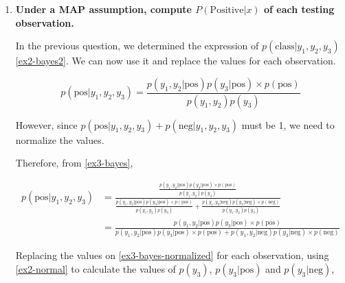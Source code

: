 \documentclass[12pt]{article}
\begin{document}
\begin{enumerate}[leftmargin=\labelsep,resume]
    \item \textbf{Under a MAP assumption, compute $P(\text{Positive} | x)$ of each testing observation.}

          In the previous question, we determined the expression of $p(\text{class} | y_1,y_2,y_3)$ \eqref{ex2-bayes2}.
          We can now use it and replace the values for each observation.

          \begin{equation}\label{ex3-bayes}
              p(\text{pos}| y_1, y_2, y_3) = \frac{p(y_1, y_2 | \text{pos}) p(y_3 | \text{pos}) \times p(\text{pos})}{p(y_1, y_2)p(y_3)}
          \end{equation}

          However, since $p(\text{pos}|y_1,y_2,y_3) + p(\text{neg}|y_1,y_2,y_3)$ must be 1, we need to normalize the values.

          Therefore, from \eqref{ex3-bayes},

          \begin{equation}\label{ex3-bayes-normalized}
              \begin{aligned}
                  p(\text{pos}| y_1, y_2, y_3) & = \frac{
                      \frac{p(y_1, y_2 | \text{pos}) p(y_3 | \text{pos}) \times p(\text{pos})}{p(y_1, y_2)p(y_3)}
                  }{
                      \frac{p(y_1, y_2 | \text{pos}) p(y_3 | \text{pos}) \times p(\text{pos})}{p(y_1, y_2)p(y_3)} +
                      \frac{p(y_1, y_2 | \text{neg}) p(y_3 | \text{neg}) \times p(\text{neg})}{p(y_1, y_2)p(y_3)}
                  }                                       \\
                                               & = \frac{
                      p(y_1, y_2 | \text{pos}) p(y_3 | \text{pos}) \times p(\text{pos})
                  }{
                      p(y_1, y_2 | \text{pos}) p(y_3 | \text{pos}) \times p(\text{pos}) +
                      p(y_1, y_2 | \text{neg}) p(y_3 | \text{neg}) \times p(\text{neg})
                  }
              \end{aligned}
          \end{equation}

          Replacing the values on \eqref{ex3-bayes-normalized} for each observation,
          using \eqref{ex2-normal} to calculate the values of $p(y_3)$,
          $p(y_3|\text{pos})$ and $p(y_3|\text{neg})$,


\end{enumerate}
\end{document}
